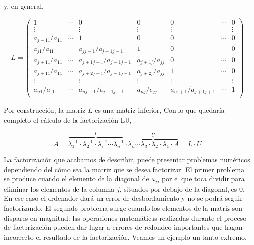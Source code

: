 y, en general,

\begin{equation*}
 L=\begin{pmatrix}
1& \cdots & 0& 0& 0& \cdots & 0\\
 \vdots &  &  \vdots & \vdots &  \vdots & & \vdots\\
a_{j-11}/a_{11}& \cdots & 1& 0& 0& \cdots & 0\\
a_{j1}/a_{11}& \cdots & a_{jj-1}/a_{j-1 j-1}& 1& 0& \cdots & 0\\
a_{j+11}/a_{11}& \cdots &a_{j+1j-1}/a_{j-1 j-1} & a_{j+1j}/a_{jj}& 0& \cdots & 0\\
a_{j+11}/a_{11}& \cdots &a_{j+2j-1}/a_{j-1 j-1} & a_{j+2j}/a_{jj}& 1& \cdots & 0\\
 \vdots &  &  \vdots & \vdots &  \vdots & & \vdots\\
a_{n1}/a_{11}& \cdots & a_{nj-1}/a_{j-1j-1}& a_{nj}/a_{jj}& a_{nj+1}/a_{j+1j+1}&\cdots & 1\\
\end{pmatrix}
\end{equation*}

Por construcción,  la matriz $L$ es una matriz inferior, Con lo que quedaría completo el cálculo de la factorización LU,

\begin{equation*}
A=\overbrace{\lambda_1^{-1} \cdot  \lambda_2^{-1}\cdot  \lambda_3^{-1} \cdots  \lambda_n ^{-1}}^{L}\cdot \overbrace{\lambda_n \cdots \lambda_3 \cdot \lambda_2\cdot \lambda_1  \cdot A}^{U}=L\cdot U
\end{equation*}

La factorización que acabamos de describir, puede presentar problemas numéricos dependiendo del cómo sea la matriz que se desea factorizar. El primer problema se produce cuando el elemento de la diagonal de $u_{jj}$ por el que toca dividir para eliminar los elementos de la columna $j$, situados por debajo de la diagonal, es $0$. En ese caso el ordenador dará un error de desbordamiento y no se podrá seguir factorizando. El segundo problema surge cuando los elementos de la matriz son dispares en magnitud; las operaciones matemáticas realizadas durante el proceso de factorización pueden dar lugar a errores de redondeo importantes que hagan incorrecto el resultado de la factorización. Veamos un ejemplo un tanto extremo,

